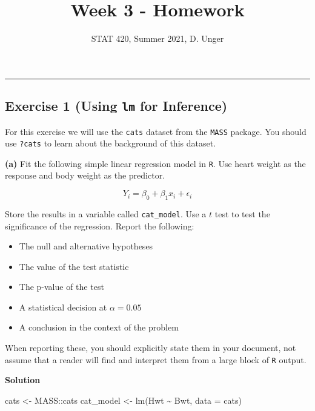 \documentclass[
]{article}
\title{Week 3 - Homework}
\author{STAT 420, Summer 2021, D. Unger}
\date{}
\newenvironment{Shaded}{\begin{snugshade}}{\end{snugshade}}
\newcommand{\AttributeTok}[1]{\textcolor[rgb]{0.77,0.63,0.00}{#1}}
\newcommand{\FunctionTok}[1]{\textcolor[rgb]{0.00,0.00,0.00}{#1}}
\newcommand{\NormalTok}[1]{#1}
\newcommand{\OtherTok}[1]{\textcolor[rgb]{0.56,0.35,0.01}{#1}}
\newcommand{\SpecialCharTok}[1]{\textcolor[rgb]{0.00,0.00,0.00}{#1}}
\providecommand{\tightlist}{%
  \setlength{\itemsep}{0pt}\setlength{\parskip}{0pt}}
\begin{document}
\maketitle

\begin{center}\rule{0.5\linewidth}{0.5pt}\end{center}

\hypertarget{exercise-1-using-lm-for-inference}{%
\subsection{\texorpdfstring{Exercise 1 (Using \texttt{lm} for
Inference)}{Exercise 1 (Using lm for Inference)}}\label{exercise-1-using-lm-for-inference}}

For this exercise we will use the \texttt{cats} dataset from the
\texttt{MASS} package. You should use \texttt{?cats} to learn about the
background of this dataset.

\textbf{(a)} Fit the following simple linear regression model in
\texttt{R}. Use heart weight as the response and body weight as the
predictor.

\[
Y_i = \beta_0 + \beta_1 x_i + \epsilon_i
\]

Store the results in a variable called \texttt{cat\_model}. Use a \(t\)
test to test the significance of the regression. Report the following:

\begin{itemize}
\tightlist
\item
  The null and alternative hypotheses
\item
  The value of the test statistic
\item
  The p-value of the test
\item
  A statistical decision at \(\alpha = 0.05\)
\item
  A conclusion in the context of the problem
\end{itemize}

When reporting these, you should explicitly state them in your document,
not assume that a reader will find and interpret them from a large block
of \texttt{R} output.

\textbf{Solution}

\begin{Shaded}
\begin{Highlighting}[]
\NormalTok{cats }\OtherTok{\textless{}{-}}\NormalTok{ MASS}\SpecialCharTok{::}\NormalTok{cats}
\NormalTok{cat\_model }\OtherTok{\textless{}{-}} \FunctionTok{lm}\NormalTok{(Hwt }\SpecialCharTok{\textasciitilde{}}\NormalTok{ Bwt, }\AttributeTok{data =}\NormalTok{ cats)}
\end{Highlighting}
\end{Shaded}
\end{document}
